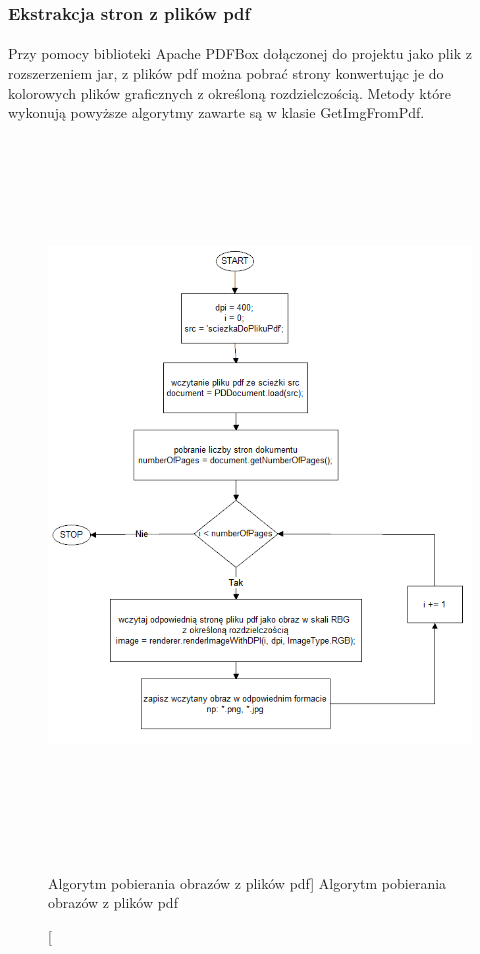 \documentclass[a4paper,12pt]{article}
\begin{document}
	\subsubsection{Ekstrakcja stron z plików pdf}
		\paragraph{\indent} Przy pomocy biblioteki Apache PDFBox dołączonej do projektu jako plik z rozszerzeniem jar, z plików pdf można pobrać strony konwertując je do kolorowych plików graficznych z określoną rozdzielczością. Metody które wykonują powyższe algorytmy zawarte są w klasie GetImgFromPdf.

        
		\begin{figure}[!ht]  
			\begin{center}
				\includegraphics[height=19cm]{image//algorithm//getImgFromPdf.png}%
			\end{center}
			\caption
    			[Algorytm pobierania obrazów z plików pdf]  
	    		{Algorytm pobierania obrazów z plików pdf}  
		\end{figure}
		\newpage
\end{document}
